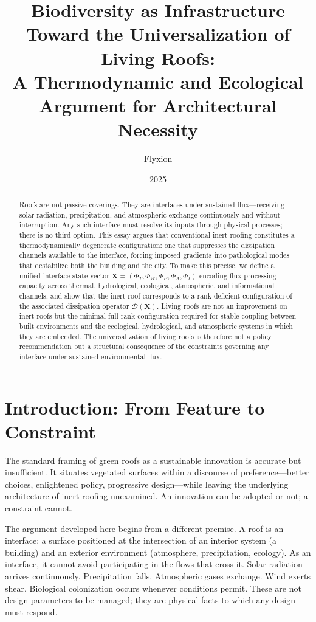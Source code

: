 \documentclass[12pt, a4paper]{article}
\title{%
  \textbf{Biodiversity as Infrastructure}\\[0.5em]
  \large Toward the Universalization of Living Roofs:\\[0.2em]
  A Thermodynamic and Ecological Argument for Architectural Necessity
}
\author{Flyxion}
\date{2025}
\theoremstyle{plain}
\theoremstyle{remark}
\begin{document}
\maketitle
\thispagestyle{empty}

\begin{abstract}
\noindent
Roofs are not passive coverings. They are interfaces under sustained flux---receiving solar radiation, precipitation, and atmospheric exchange continuously and without interruption. Any such interface must resolve its inputs through physical processes; there is no third option. This essay argues that conventional inert roofing constitutes a thermodynamically degenerate configuration: one that suppresses the dissipation channels available to the interface, forcing imposed gradients into pathological modes that destabilize both the building and the city. To make this precise, we define a unified interface state vector $\mathbf{X} = (\Phi_T, \Phi_W, \Phi_E, \Phi_A, \Phi_I)$ encoding flux-processing capacity across thermal, hydrological, ecological, atmospheric, and informational channels, and show that the inert roof corresponds to a rank-deficient configuration of the associated dissipation operator $\mathcal{D}(\mathbf{X})$. Living roofs are not an improvement on inert roofs but the minimal full-rank configuration required for stable coupling between built environments and the ecological, hydrological, and atmospheric systems in which they are embedded. The universalization of living roofs is therefore not a policy recommendation but a structural consequence of the constraints governing any interface under sustained environmental flux.
\end{abstract}

\tableofcontents

\bigskip\bigskip

\section{Introduction: From Feature to Constraint}

The standard framing of green roofs as a sustainable innovation is accurate but insufficient. It situates vegetated surfaces within a discourse of preference---better choices, enlightened policy, progressive design---while leaving the underlying architecture of inert roofing unexamined. An innovation can be adopted or not; a constraint cannot.

The argument developed here begins from a different premise. A roof is an interface: a surface positioned at the intersection of an interior system (a building) and an exterior environment (atmosphere, precipitation, ecology). As an interface, it cannot avoid participating in the flows that cross it. Solar radiation arrives continuously. Precipitation falls. Atmospheric gases exchange. Wind exerts shear. Biological colonization occurs whenever conditions permit. These are not design parameters to be managed; they are physical facts to which any design must respond.
\end{document}
